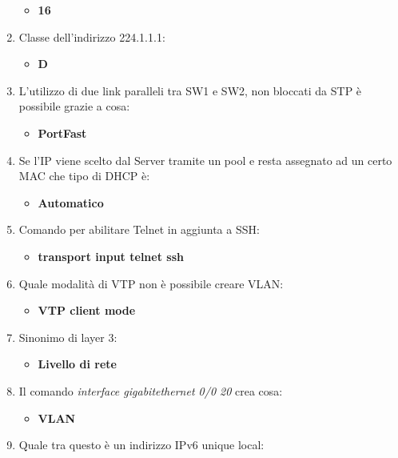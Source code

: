 \begin{enumerate}
  \begin{itemize}
  \item
    \textbf{16}
  \end{itemize}
\item
  Classe dell'indirizzo 224.1.1.1:

  \begin{itemize}
  \item
    \textbf{D}
  \end{itemize}
\item
  L'utilizzo di due link paralleli tra SW1 e SW2, non bloccati da STP è
  possibile grazie a cosa:

  \begin{itemize}
  \item
    \textbf{PortFast}
  \end{itemize}
\item
  Se l'IP viene scelto dal Server tramite un pool e resta assegnato ad
  un certo MAC che tipo di DHCP è:

  \begin{itemize}
  \item
    \textbf{Automatico}
  \end{itemize}
\item
  Comando per abilitare Telnet in aggiunta a SSH:

  \begin{itemize}
  \item
    \textbf{transport input telnet ssh}
  \end{itemize}
\item
  Quale modalità di VTP non è possibile creare VLAN:

  \begin{itemize}
  \item
    \textbf{VTP client mode}
  \end{itemize}
\item
  Sinonimo di layer 3:

  \begin{itemize}
  \item
    \textbf{Livello di rete}
  \end{itemize}
\item
  Il comando \emph{interface gigabitethernet 0/0 20} crea cosa:

  \begin{itemize}
  \item
    \textbf{VLAN}
  \end{itemize}
\item
  Quale tra questo è un indirizzo IPv6 unique local:


\end{enumerate}
